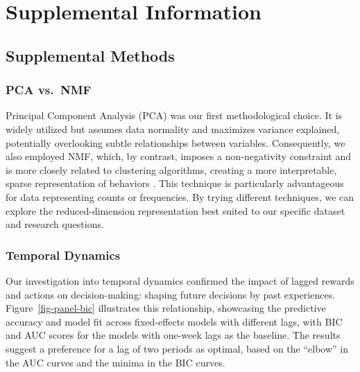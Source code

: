 \documentclass[
  number,
  preprint,
  3p,
  onecolumn]{elsarticle}
\begin{document}
\renewcommand{\bibsection}{}


\newpage{}

\section{Supplemental Information}\label{supplemental-information}

\subsection{Supplemental Methods}\label{supplemental-methods}

\subsubsection{PCA vs.~NMF}\label{pca-vs.-nmf}

Principal Component Analysis (PCA) was our first methodological choice.
It is widely utilized but assumes data normality \citep{jolliffe2016}
and maximizes variance explained, potentially overlooking subtle
relationships between variables. Consequently, we also employed NMF,
which, by contrast, imposes a non-negativity constraint and is more
closely related to clustering algorithms, creating a more interpretable,
sparse representation of behaviors \citep{ding2005, lee1999}. This
technique is particularly advantageous for data representing counts or
frequencies. By trying different techniques, we can explore the
reduced-dimension representation best suited to our specific dataset and
research questions.

\subsubsection{Temporal Dynamics}\label{temporal-dynamics}

Our investigation into temporal dynamics confirmed the impact of lagged
rewards and actions on decision-making: shaping future decisions by past
experiences. Figure~\ref{fig-panel-bic} illustrates this relationship,
showcasing the predictive accuracy and model fit across fixed-effects
models with different lags, with BIC and AUC scores for the models with
one-week lags as the baseline. The results suggest a preference for a
lag of two periods as optimal, based on the ``elbow'' in the AUC curves
and the minima in the BIC curves.
\end{document}
